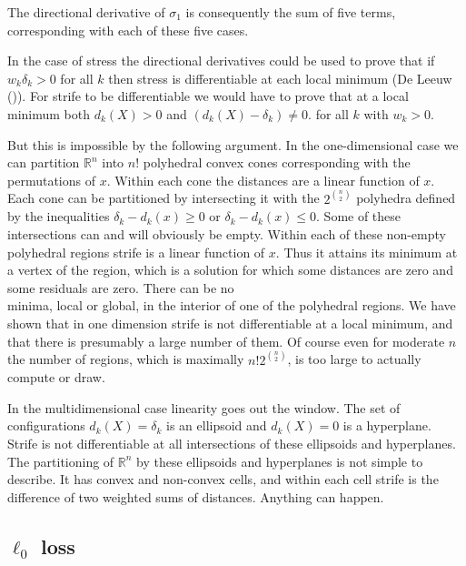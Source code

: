 \documentclass[
  12pt,
  letterpaper,
  DIV=11,
  numbers=noendperiod]{scrartcl}
\theoremstyle{plain}
\theoremstyle{plain}
\theoremstyle{plain}
\theoremstyle{definition}
\theoremstyle{remark}
\begin{document}
The directional derivative of \(\sigma_1\) is consequently the sum of
five terms, corresponding with each of these five cases.

In the case of stress the directional derivatives could be used to prove
that if \(w_k\delta_k>0\) for all \(k\) then stress is differentiable at
each local minimum (De Leeuw ()). For
strife to be differentiable we would have to prove that at a local
minimum both \(d_k(X)>0\) and \((d_k(X)-\delta_k)\not= 0\). for all
\(k\) with \(w_k>0\).

But this is impossible by the following argument. In the one-dimensional
case we can partition \(\mathbb{R}^n\) into \(n!\) polyhedral convex
cones corresponding with the permutations of \(x\). Within each cone the
distances are a linear function of \(x\). Each cone can be partitioned
by intersecting it with the \(2^\binom{n}{2}\) polyhedra defined by the
inequalities \(\delta_k-d_k(x)\geq 0\) or \(\delta_k-d_k(x)\leq 0\).
Some of these intersections can and will obviously be empty. Within each
of these non-empty polyhedral regions strife is a linear function of
\(x\). Thus it attains its minimum at a vertex of the region, which is a
solution for which some distances are zero and some residuals are zero.
There can be no\\
minima, local or global, in the interior of one of the polyhedral
regions. We have shown that in one dimension strife is not
differentiable at a local minimum, and that there is presumably a large
number of them. Of course even for moderate \(n\) the number of regions,
which is maximally \(n!2^\binom{n}{2}\), is too large to actually
compute or draw.

In the multidimensional case linearity goes out the window. The set of
configurations \(d_k(X)=\delta_k\) is an ellipsoid and \(d_k(X)=0\) is a
hyperplane. Strife is not differentiable at all intersections of these
ellipsoids and hyperplanes. The partitioning of \(\mathbb{R}^n\) by
these ellipsoids and hyperplanes is not simple to describe. It has
convex and non-convex cells, and within each cell strife is the
difference of two weighted sums of distances. Anything can happen.

\subsection{\texorpdfstring{\(\ell_0\)
loss}{\textbackslash ell\_0 loss}}\label{ell_0-loss}
\end{document}
